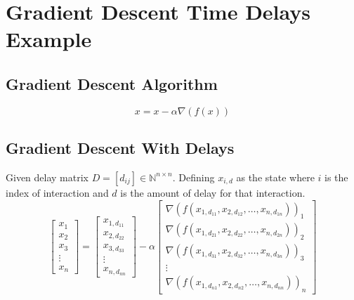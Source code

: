 \documentclass[10pt]{elsarticle}
\theoremstyle{remark}
\begin{document}
\section*{Gradient Descent Time Delays Example}

\subsection*{Gradient Descent Algorithm}
\begin{equation}
x = x - \alpha\nabla(f(x))
\end{equation}

\subsection*{Gradient Descent With Delays}
Given delay matrix $D=[d_{ij}]\in\mathbb{N}^{n\times n}$.
Defining $x_{i,d}$ as the state where $i$ is the index of interaction and $d$ is the amount of delay for that interaction.
\[
\begin{bmatrix}
   x_{1}\\
   x_{2}\\
   x_{3}\\
   \vdots\\
   x_{n}
\end{bmatrix} =
\begin{bmatrix}
   x_{1,d_{11}}\\
   x_{2,d_{22}}\\
   x_{3,d_{33}}\\
   \vdots\\
   x_{n,d_{nn}}
\end{bmatrix} - \alpha
\begin{bmatrix}
   \nabla(f(x_{1,d_{11}}, x_{2,d_{12}}, \dots, x_{n,d_{1n}}))_{1} \\
   \nabla(f(x_{1,d_{21}}, x_{2,d_{22}}, \dots, x_{n,d_{2n}}))_{2} \\
   \nabla(f(x_{1,d_{31}}, x_{2,d_{32}}, \dots, x_{n,d_{3n}}))_{3} \\
   \vdots\\
   \nabla(f(x_{1, d_{n1}}, x_{2,d_{n2}}, \dots, x_{n,d_{nn}}))_{n}
\end{bmatrix}
\]
\end{document}
